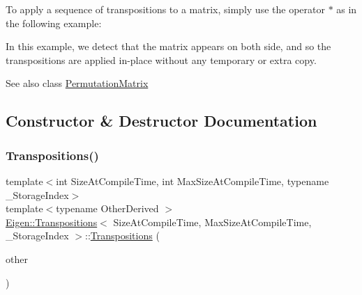 To apply a sequence of transpositions to a matrix, simply use the operator $\ast$ as in the following example\+: 
\begin{DoxyCode}{0}
\end{DoxyCode}
 In this example, we detect that the matrix appears on both side, and so the transpositions are applied in-\/place without any temporary or extra copy.

\begin{DoxySeeAlso}{See also}
class \mbox{\hyperlink{class_eigen_1_1_permutation_matrix}{Permutation\+Matrix}} 
\end{DoxySeeAlso}


\subsection{Constructor \& Destructor Documentation}
\mbox{\label{class_eigen_1_1_transpositions_aae3eb58072f5b26f3851925eec5a006f}} 
\subsubsection{\texorpdfstring{Transpositions()}{Transpositions()}\hspace{0.1cm}{\footnotesize\ttfamily [1/4]}}
{\footnotesize\ttfamily template$<$int Size\+At\+Compile\+Time, int Max\+Size\+At\+Compile\+Time, typename \+\_\+\+Storage\+Index$>$ \\
template$<$typename Other\+Derived $>$ \\
\mbox{\hyperlink{class_eigen_1_1_transpositions}{Eigen\+::\+Transpositions}}$<$ Size\+At\+Compile\+Time, Max\+Size\+At\+Compile\+Time, \+\_\+\+Storage\+Index $>$\+::\mbox{\hyperlink{class_eigen_1_1_transpositions}{Transpositions}} (\begin{DoxyParamCaption}\item[{const \mbox{\hyperlink{class_eigen_1_1_transpositions_base}{Transpositions\+Base}}$<$ Other\+Derived $>$ \&}]{other }\end{DoxyParamCaption})\hspace{0.3cm}{\ttfamily [inline]}}

